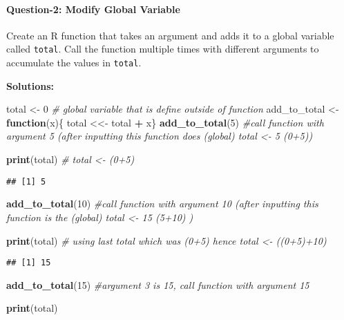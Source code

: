 \documentclass[
]{article}
\newenvironment{Shaded}{\begin{snugshade}}{\end{snugshade}}
\newcommand{\CommentTok}[1]{\textcolor[rgb]{0.56,0.35,0.01}{\textit{#1}}}
\newcommand{\ControlFlowTok}[1]{\textcolor[rgb]{0.13,0.29,0.53}{\textbf{#1}}}
\newcommand{\DecValTok}[1]{\textcolor[rgb]{0.00,0.00,0.81}{#1}}
\newcommand{\FunctionTok}[1]{\textcolor[rgb]{0.13,0.29,0.53}{\textbf{#1}}}
\newcommand{\NormalTok}[1]{#1}
\newcommand{\OtherTok}[1]{\textcolor[rgb]{0.56,0.35,0.01}{#1}}
\newcommand{\SpecialCharTok}[1]{\textcolor[rgb]{0.81,0.36,0.00}{\textbf{#1}}}
\begin{document}
\hypertarget{question-2-modify-global-variable}{%
\paragraph{Question-2: Modify Global
Variable}\label{question-2-modify-global-variable}}

Create an R function that takes an argument and adds it to a global
variable called \texttt{total}. Call the function multiple times with
different arguments to accumulate the values in \texttt{total}.

\textbf{Solutions:}

\begin{Shaded}
\begin{Highlighting}[]
\NormalTok{total }\OtherTok{\textless{}{-}} \DecValTok{0} \CommentTok{\# global variable that is define outside of function}
\NormalTok{add\_to\_total }\OtherTok{\textless{}{-}} \ControlFlowTok{function}\NormalTok{(x)\{ total }\OtherTok{\textless{}\textless{}{-}}\NormalTok{ total }\SpecialCharTok{+}\NormalTok{ x\}}
\FunctionTok{add\_to\_total}\NormalTok{(}\DecValTok{5}\NormalTok{) }\CommentTok{\#call function with argument 5 (after inputting this function does (global) total \textless{}{-} 5 (0+5))}

\FunctionTok{print}\NormalTok{(total) }\CommentTok{\# total \textless{}{-} (0+5)}
\end{Highlighting}
\end{Shaded}

\begin{verbatim}
## [1] 5
\end{verbatim}

\begin{Shaded}
\begin{Highlighting}[]
\FunctionTok{add\_to\_total}\NormalTok{(}\DecValTok{10}\NormalTok{) }\CommentTok{\#call function with argument 10 (after inputting this function is the (global) total \textless{}{-} 15 (5+10) )}

\FunctionTok{print}\NormalTok{(total) }\CommentTok{\# using last total which was (0+5) hence total \textless{}{-} ((0+5)+10)}
\end{Highlighting}
\end{Shaded}

\begin{verbatim}
## [1] 15
\end{verbatim}

\begin{Shaded}
\begin{Highlighting}[]
\FunctionTok{add\_to\_total}\NormalTok{(}\DecValTok{15}\NormalTok{) }\CommentTok{\#argument 3 is 15, call function with argument 15}

\FunctionTok{print}\NormalTok{(total) }
\end{Highlighting}
\end{Shaded}
\end{document}

